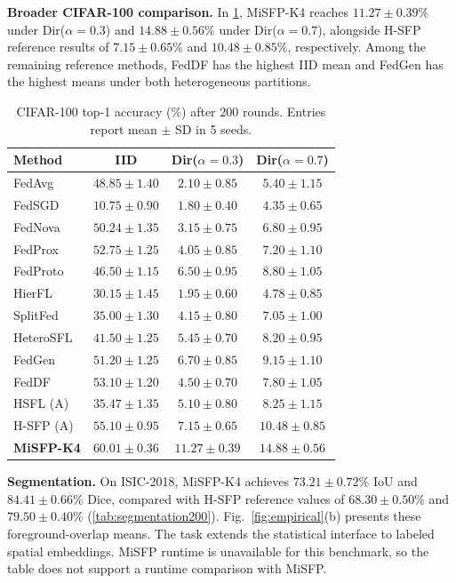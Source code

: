\noindent\textbf{Broader CIFAR-100 comparison.} In \cref{tab:reference}, MiSFP-K4 reaches $11.27\pm0.39\%$ under Dir($\alpha=0.3$) and $14.88\pm0.56\%$ under Dir($\alpha=0.7$), alongside H-SFP reference results of $7.15\pm0.65\%$ and $10.48\pm0.85\%$, respectively. Among the remaining reference methods, FedDF has the highest IID mean and FedGen has the highest means under both heterogeneous partitions.

\begin{table}[t]
\caption{CIFAR-100 top-1 accuracy (\%) after 200 rounds. Entries report mean $\pm$ SD in 5 seeds.}
\label{tab:reference}
\centering
\footnotesize
\setlength{\tabcolsep}{2.5pt}
\begin{tabular*}{\columnwidth}{@{\extracolsep{\fill}}lccc@{}}
\toprule
Method & IID & Dir($\alpha=0.3$) & Dir($\alpha=0.7$)\\
\midrule
FedAvg & $48.85\pm1.40$ & $2.10\pm0.85$ & $5.40\pm1.15$\\
FedSGD & $10.75\pm0.90$ & $1.80\pm0.40$ & $4.35\pm0.65$\\
FedNova & $50.24\pm1.35$ & $3.15\pm0.75$ & $6.80\pm0.95$\\
FedProx & $52.75\pm1.25$ & $4.05\pm0.85$ & $7.20\pm1.10$\\
FedProto & $46.50\pm1.15$ & $6.50\pm0.95$ & $8.80\pm1.05$\\
HierFL & $30.15\pm1.45$ & $1.95\pm0.60$ & $4.78\pm0.85$\\
SplitFed & $35.00\pm1.30$ & $4.15\pm0.80$ & $7.05\pm1.00$\\
HeteroSFL & $41.50\pm1.25$ & $5.45\pm0.70$ & $8.20\pm0.95$\\
FedGen & $51.20\pm1.25$ & $6.70\pm0.85$ & $9.15\pm1.10$\\
FedDF & $53.10\pm1.20$ & $4.50\pm0.70$ & $7.80\pm1.05$\\
HSFL (A) & $35.47\pm1.35$ & $5.10\pm0.80$ & $8.25\pm1.15$\\
H-SFP (A) & $55.10\pm0.95$ & $7.15\pm0.65$ & $10.48\pm0.85$\\
\midrule
\textbf{MiSFP-K4} & $60.01\pm0.36$ & $11.27\pm0.39$ & $14.88\pm0.56$\\
\bottomrule
\end{tabular*}
\end{table}

\noindent\textbf{Segmentation.} On ISIC-2018, MiSFP-K4 achieves $73.21\pm0.72\%$ IoU and $84.41\pm0.66\%$ Dice, compared with H-SFP reference values of $68.30\pm0.50\%$ and $79.50\pm0.40\%$ (\cref{tab:segmentation200}). Fig.~\ref{fig:empirical}(b) presents these foreground-overlap means. The task extends the statistical interface to labeled spatial embeddings. MiSFP runtime is unavailable for this benchmark, so the table does not support a runtime comparison with MiSFP.

